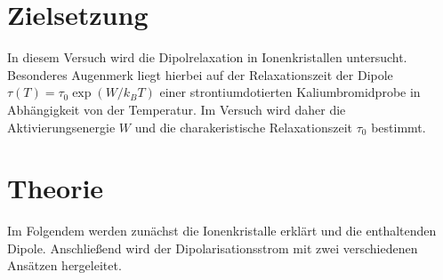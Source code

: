 \section{Zielsetzung}
\label{sec:Zielsetzung}
In diesem Versuch wird die Dipolrelaxation in Ionenkristallen untersucht. Besonderes Augenmerk liegt hierbei auf der Relaxationszeit der Dipole
$\tau(T)=\tau_0 \exp(W/k_BT)$ einer strontiumdotierten Kaliumbromidprobe in Abhängigkeit von der Temperatur.
Im Versuch wird daher die Aktivierungsenergie $W$ und die charakeristische Relaxationszeit $\tau_0$ bestimmt.

\section{Theorie}
\label{sec:Theorie}
 
Im Folgendem werden zunächst die Ionenkristalle erklärt und die enthaltenden Dipole. Anschließend wird der 
Dipolarisationsstrom mit zwei verschiedenen Ansätzen hergeleitet.

